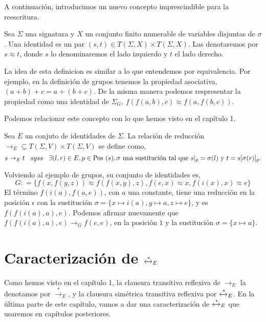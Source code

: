 A continuación, introducimos un nuevo concepto imprescindible para la reescritura.

\begin{defi}
  Sea $\Sigma$ una signatura y $X$ un conjunto finito numerable de variables
  disjuntas de $\sigma$. Una identidad es un par
  $(s,t) \in T(\Sigma, X) \times T(\Sigma, X)$. Las denotaremos por
  $s \approx t$, donde $s$ lo denominaremos el lado izquierdo y $t$ el lado
  derecho.
\end{defi} 

La idea de esta definicion es similar a lo que entendemos por
equivalencia. Por ejemplo, en la definición de grupos tenemos la
propiedad asociativa, $(a+b)+c =a+(b+c)$. De la misma manera podemos
respresentar la propiedad como una identidad de $\Sigma_G$,
$f(f(a,b),c) \approx f(a,f(b,c))$.

Podemos relacionar este concepto con lo que hemos visto en el capítulo 1.

\begin{defi}
  Sea $E$ un conjuto de identidades de $\Sigma$. La relación de
  reducción $\rightarrow_E \subseteq T(\Sigma, V) \times T(\Sigma, V)$
  se define como,
  \[
    s \rightarrow_E t \hspace{.3cm} syss \hspace{.3cm} \exists(l,r)
    \in E, p \in \mbox{Pos } (s), \sigma \text{ una sustitución tal que } s|_p = \sigma(l) \text{ y } t=
    s[\sigma(r)]_p.
  \]
\end{defi}

Volviendo al ejemplo de grupos, su conjunto de identidades es,
\[
  G : = \{f(x,f(y,z)) \approx f(f(x,y),z), f(e,x) \approx x, f(i(x),x)
  \approx e \}
\]
El término $f(i(a), f(a,e))$, con $a$ una constante, tiene una
reducción en la posición $\epsilon$ con la sustitución
$\sigma = \{x \mapsto i(a), y \mapsto a, z \mapsto e \}$, y es
$f(f(i(a),a),e)$. Podemos afirmar nuevamente que
$f(f(i(a),a),e) \rightarrow_G f(e,e)$, en la posición $1$ y la
sustitución $\sigma = \{x \mapsto a \}$.



\section{Caracterización de $\xleftrightarrow{*}_E$}

Como hemos visto en el capítulo 1, la clausura transitiva reflexiva de
$\rightarrow_E$ la denotamos por $\xrightarrow{*}_E$, y la clausura
simétrica transitiva reflexiva por $\xleftrightarrow{*}_E$. En la
última parte de este capítulo, vamos a dar una caracterización de
$\xleftrightarrow{*}_E$ que usaremos en capítulos posteriores.

